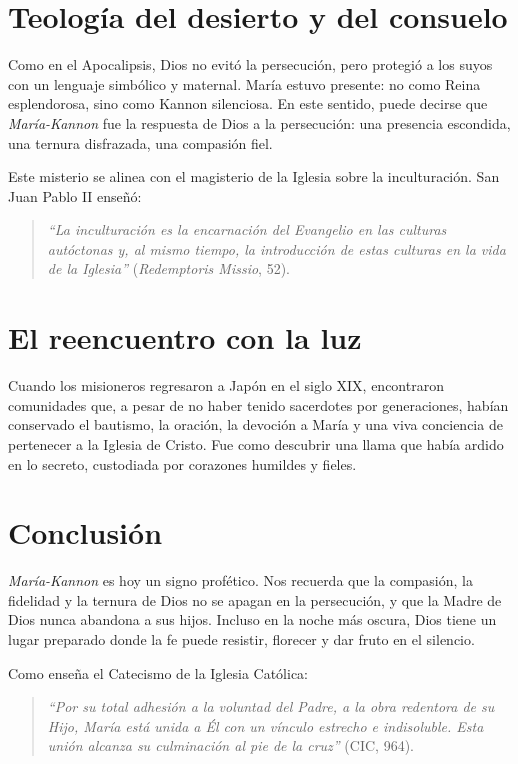 \documentclass[12pt,a4paper]{article}
\begin{document}
	\section*{Teología del desierto y del consuelo}
	
	Como en el Apocalipsis, Dios no evitó la persecución, pero protegió a los suyos con un lenguaje simbólico y maternal. María estuvo presente: no como Reina esplendorosa, sino como Kannon silenciosa. En este sentido, puede decirse que \emph{María-Kannon} fue la respuesta de Dios a la persecución: una presencia escondida, una ternura disfrazada, una compasión fiel.
	
	Este misterio se alinea con el magisterio de la Iglesia sobre la inculturación. San Juan Pablo II enseñó:
	
	\begin{quote}
		\textit{``La inculturación es la encarnación del Evangelio en las culturas autóctonas y, al mismo tiempo, la introducción de estas culturas en la vida de la Iglesia''} (\emph{Redemptoris Missio}, 52).
	\end{quote}
	
	\section*{El reencuentro con la luz}
	
	Cuando los misioneros regresaron a Japón en el siglo XIX, encontraron comunidades que, a pesar de no haber tenido sacerdotes por generaciones, habían conservado el bautismo, la oración, la devoción a María y una viva conciencia de pertenecer a la Iglesia de Cristo. Fue como descubrir una llama que había ardido en lo secreto, custodiada por corazones humildes y fieles.
	
	\section*{Conclusión}
	
	\emph{María-Kannon} es hoy un signo profético. Nos recuerda que la compasión, la fidelidad y la ternura de Dios no se apagan en la persecución, y que la Madre de Dios nunca abandona a sus hijos. Incluso en la noche más oscura, Dios tiene un lugar preparado donde la fe puede resistir, florecer y dar fruto en el silencio.
	
	Como enseña el Catecismo de la Iglesia Católica:
	
	\begin{quote}
		\textit{``Por su total adhesión a la voluntad del Padre, a la obra redentora de su Hijo, María está unida a Él con un vínculo estrecho e indisoluble. Esta unión alcanza su culminación al pie de la cruz''} (CIC, 964).
	\end{quote}
	
\end{document}
